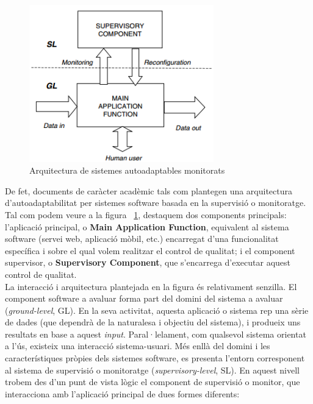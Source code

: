 \begin{figure}
\centering
\includegraphics[width=8cm]{Figures/Figure1}
\decoRule
\caption[Arquitectura de sistemes auotadaptables monitorats]{Arquitectura de sistemes autoadaptables monitorats}
\label{fig:Figura1}
\end{figure}

De fet, documents de caràcter acadèmic tals com \cite{nashville} plantegen una arquitectura d’autoadaptabilitat per sistemes software basada en la supervisió o monitoratge. Tal com podem veure a la figura ~\ref{fig:Figura1}, destaquem dos components principals: l’aplicació principal, o \textbf{Main Application Function}, equivalent al sistema software (servei web, aplicació mòbil, etc.) encarregat d'una funcionalitat específica i sobre el qual volem realitzar el control de qualitat; i el component supervisor, o \textbf{Supervisory Component}, que s'encarrega d'executar aquest control de qualitat.\\

La interacció i arquitectura plantejada en la figura és relativament senzilla. El component software a avaluar forma part del domini del sistema a avaluar (\textit{ground-level}, GL). En la seva activitat, aquesta aplicació o sistema rep una sèrie de dades (que dependrà de la naturalesa i objectiu del sistema), i produeix uns resultats en base a aquest \textit{input}. Paral·lelament, com qualsevol sistema orientat a l'ús, existeix una interacció sistema-usuari. Més enllà del domini i les característiques pròpies dels sistemes software, es presenta l'entorn corresponent al sistema de supervisió o monitoratge (\textit{supervisory-level}, SL). En aquest nivell trobem des d'un punt de vista lògic el component de supervisió o monitor, que interacciona amb l'aplicació principal de dues formes diferents:


